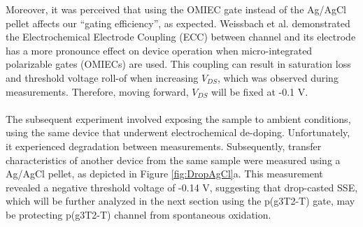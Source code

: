 Moreover, it was perceived that using the OMIEC gate instead of the Ag/AgCl pellet affects our ``gating efficiency'', as expected. Weissbach et al.  \cite{weissbachUnravelingElectrochemicalElectrode2023} demonstrated the Electrochemical Electrode Coupling (ECC) between channel and its electrode has a more pronounce effect on device operation when micro-integrated polarizable gates (OMIECs) are used. This coupling can result in saturation loss %
and threshold voltage roll-of when increasing $V_{DS}$, which was observed during measurements. Therefore, moving forward, $V_{DS}$ will be fixed at -0.1 V.
\\\\
The subsequent experiment involved exposing the sample to ambient conditions, using the same device that underwent electrochemical de-doping. Unfortunately, it experienced degradation between measurements. Subsequently, transfer characteristics of another device from the same sample were measured using a Ag/AgCl pellet, as depicted in Figure \ref{fig:DropAgCl}a. This measurement revealed a negative threshold voltage of -0.14 V, suggesting that drop-casted SSE, which will be further analyzed in the next section using the p(g3T2-T) gate, may be protecting p(g3T2-T) channel from spontaneous oxidation.%

